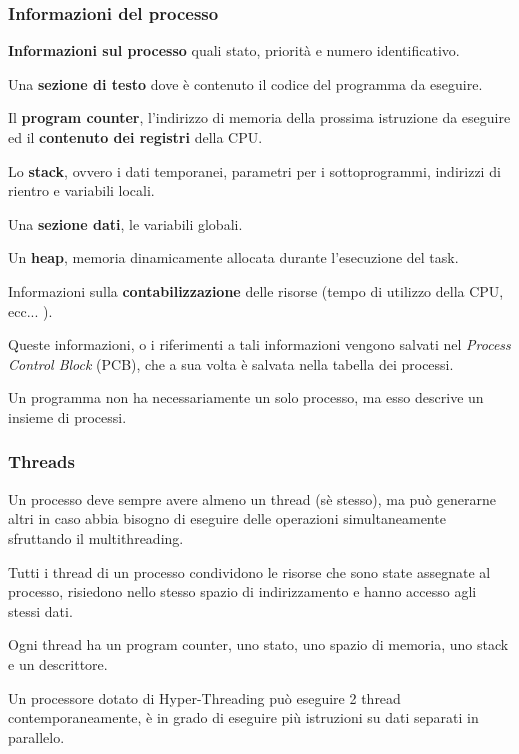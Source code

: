 \subsubsection*{Informazioni del processo}
\begin{sitemize}
    \item \textbf{Informazioni sul processo} quali stato, priorità e numero identificativo.
    \item Una \textbf{sezione di testo} dove è contenuto il codice del programma da
    eseguire.
    \item Il \textbf{program counter}, l'indirizzo di memoria della prossima istruzione da eseguire ed il \textbf{contenuto dei registri} della CPU.
    \item Lo \textbf{stack}, ovvero i dati temporanei, parametri per i sottoprogrammi, indirizzi di rientro e variabili locali.
    \item Una \textbf{sezione dati}, le variabili globali.
    \item Un \textbf{heap}, memoria dinamicamente allocata durante l'esecuzione del task.
    \item Informazioni sulla \textbf{contabilizzazione} delle risorse (tempo di utilizzo della CPU, ecc... ).
\end{sitemize}

\spacer
Queste informazioni, o i riferimenti a tali informazioni vengono salvati nel \textit{Process Control Block} (PCB), che a sua volta è salvata nella tabella dei processi.

\begin{note}
    Un programma non ha necessariamente un solo processo, ma esso descrive un insieme di processi.
\end{note}

\subsubsection{Threads}
Un processo deve sempre avere almeno un thread (sè stesso), ma può generarne altri in caso abbia bisogno di eseguire delle operazioni simultaneamente sfruttando il multithreading.

\spacer
Tutti i thread di un processo condividono le risorse che sono state assegnate al processo, risiedono nello stesso spazio di indirizzamento e hanno accesso agli stessi dati.

Ogni thread ha un program counter, uno stato, uno spazio di memoria, uno stack e un descrittore.

\spacer
Un processore dotato di Hyper-Threading può eseguire 2 thread contemporaneamente, è in grado di eseguire più istruzioni su dati separati in parallelo.


